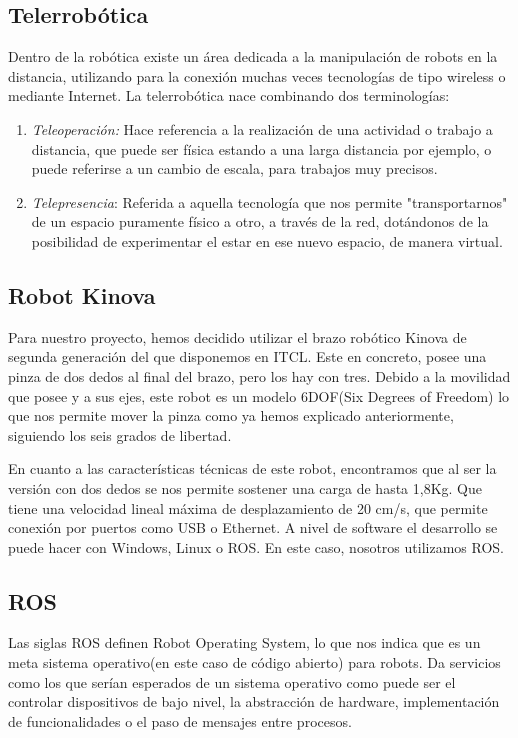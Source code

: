 \subsection{Telerrobótica}
Dentro de la robótica existe un área dedicada a la manipulación de robots en la distancia, utilizando para la conexión muchas veces tecnologías de tipo wireless o mediante Internet.
La telerrobótica\cite{Telerrobotica} nace combinando dos terminologías:
\begin{enumerate}
    \item \textit{Teleoperación:} Hace referencia a la realización de una actividad o trabajo a distancia, que puede ser física estando a una larga distancia por ejemplo, o puede referirse a un cambio de escala, para trabajos muy precisos.
    \item \textit{Telepresencia}\cite{Telepresencia}: Referida a aquella tecnología que nos permite "transportarnos" de un espacio puramente físico a otro, a través de la red, dotándonos de la posibilidad de experimentar el estar en ese nuevo espacio, de manera virtual. 
\end{enumerate}

\subsection{Robot Kinova}
Para nuestro proyecto, hemos decidido utilizar el brazo robótico Kinova de segunda generación del que disponemos en ITCL. Este en concreto, posee una pinza de dos dedos al final del brazo, pero los hay con tres. Debido a la movilidad que posee y a sus ejes, este robot es un modelo 6DOF(Six Degrees of Freedom) lo que nos permite mover la pinza como ya hemos explicado anteriormente, siguiendo los seis grados de libertad.

En cuanto a las características técnicas de este robot, encontramos que al ser la versión con dos dedos se nos permite sostener una carga de hasta 1,8Kg. Que tiene una velocidad lineal máxima de desplazamiento de 20 cm/s, que permite conexión por puertos como USB o Ethernet. A nivel de software el desarrollo se puede hacer con Windows, Linux o ROS. En este caso, nosotros utilizamos ROS.

\subsection{ROS}
Las siglas ROS\cite{ROS} definen Robot Operating System, lo que nos indica que es un meta sistema operativo(en este caso de código abierto) para robots. Da servicios como los que serían esperados de un sistema operativo como puede ser el controlar dispositivos de bajo nivel, la abstracción de hardware, implementación de funcionalidades o el paso de mensajes entre procesos.

